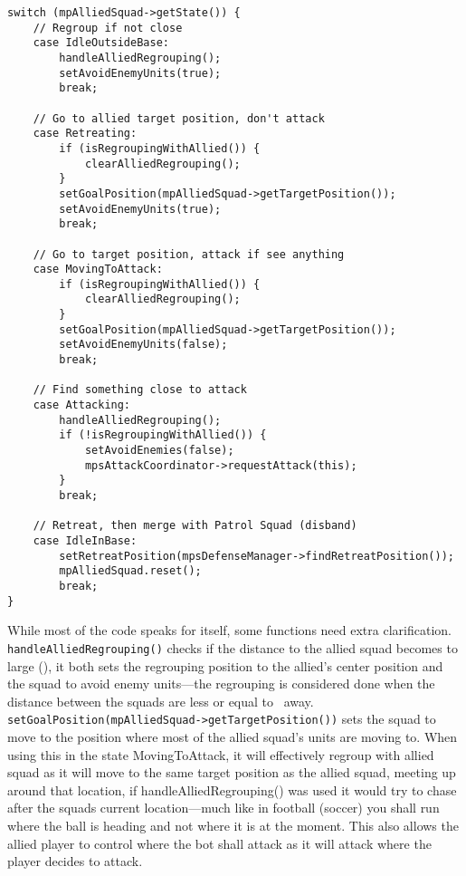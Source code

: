 \begin{lstlisting}[caption={Squad actions depending on the allied squad's state.},label={lst:attack_follow_allied}]
switch (mpAlliedSquad->getState()) {
	// Regroup if not close
	case IdleOutsideBase:
		handleAlliedRegrouping();
		setAvoidEnemyUnits(true);
		break;
	
	// Go to allied target position, don't attack
	case Retreating:
		if (isRegroupingWithAllied()) {
			clearAlliedRegrouping();
		}
		setGoalPosition(mpAlliedSquad->getTargetPosition());
		setAvoidEnemyUnits(true);
		break;

	// Go to target position, attack if see anything
	case MovingToAttack: 
		if (isRegroupingWithAllied()) {
			clearAlliedRegrouping();
		}
		setGoalPosition(mpAlliedSquad->getTargetPosition());
		setAvoidEnemyUnits(false);
		break;

	// Find something close to attack
	case Attacking:
		handleAlliedRegrouping();
		if (!isRegroupingWithAllied()) {
			setAvoidEnemies(false);
			mpsAttackCoordinator->requestAttack(this);
		}
		break;

	// Retreat, then merge with Patrol Squad (disband)
	case IdleInBase:
		setRetreatPosition(mpsDefenseManager->findRetreatPosition());
		mpAlliedSquad.reset();
		break;
}
\end{lstlisting}
While most of the code speaks for itself, some functions need extra clarification. \texttt{handleAlliedRegrouping()} checks if the distance to the allied squad becomes to large (\squadAttackAlliedRegroupBegin), it both sets the regrouping position to the allied's center position and the squad to avoid enemy units—the regrouping is considered done when the distance between the squads are less or equal to \squadAttackAlliedRegroupEnd~away. \texttt{setGoalPosition(mpAlliedSquad->getTargetPosition())} sets the squad to move to the position where most of the allied squad's units are moving to. When using this in the state MovingToAttack, it will effectively regroup with allied squad as it will move to the same target position as the allied squad, meeting up around that location, if handleAlliedRegrouping() was used it would try to chase after the squads current location—much like in football (soccer) you shall run where the ball is heading and not where it is at the moment. This also allows the allied player to control where the bot shall attack as it will attack where the player decides to attack.

